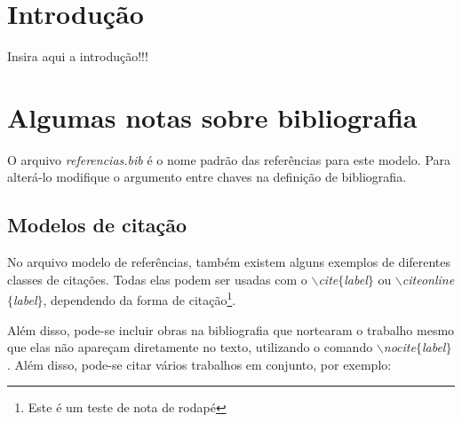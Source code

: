 \documentclass[oneside,openright,12pt]{ufsm_2021} %
\author{Fulano de Tal}   %
\begin{document}
	
	
	
	\pretextual  %
	
	
	\chapter{Introdução}
	\par Insira aqui a introdução!!!
	
	\lipsum[1-5]
	
	
	
	\chapter{Algumas notas sobre bibliografia}
	
	
	\par O arquivo \textit{referencias.bib} é o nome padrão das referências para este modelo. Para alterá-lo modifique o argumento entre chaves na definição de bibliografia.
	
	
	\section{Modelos de citação}
	\par No arquivo modelo de referências, também existem alguns exemplos de diferentes classes de citações. Todas elas podem ser usadas com o \textit{$\backslash$cite$\{$label$\}$} ou \textit{$\backslash$citeonline$\{$label$\}$}, dependendo da forma de citação\footnote{Este é um teste de nota de rodapé}.
	
	\par Além disso, pode-se incluir obras na bibliografia que nortearam o trabalho mesmo que elas não apareçam diretamente no texto, utilizando o comando \textit{$\backslash$nocite$\{$label$\}$}. Além disso, pode-se citar vários trabalhos em conjunto, por exemplo:
	
\end{document}
